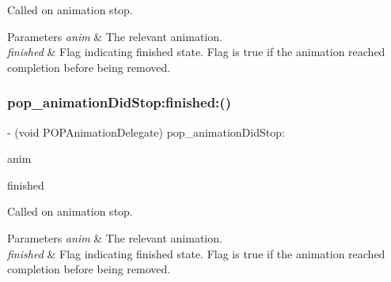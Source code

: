 Called on animation stop. 
\begin{DoxyParams}{Parameters}
{\em anim} & The relevant animation. \\
\hline
{\em finished} & Flag indicating finished state. Flag is true if the animation reached completion before being removed. \\
\hline
\end{DoxyParams}
\mbox{\label{protocol_p_o_p_animation_delegate_01-p_a5c84da0fa9e5baf068c950be6a494c07}} 
\subsubsection{\texorpdfstring{pop\+\_\+animation\+Did\+Stop\+:finished\+:()}{pop\_animationDidStop:finished:()}\hspace{0.1cm}{\footnotesize\ttfamily [2/3]}}
{\footnotesize\ttfamily -\/ (void P\+O\+P\+Animation\+Delegate) pop\+\_\+animation\+Did\+Stop\+: \begin{DoxyParamCaption}\item[{(\mbox{\hyperlink{interface_p_o_p_animation}{P\+O\+P\+Animation}} $\ast$)}]{anim }\item[{finished:(B\+O\+OL)}]{finished }\end{DoxyParamCaption}\hspace{0.3cm}{\ttfamily [optional]}}

Called on animation stop. 
\begin{DoxyParams}{Parameters}
{\em anim} & The relevant animation. \\
\hline
{\em finished} & Flag indicating finished state. Flag is true if the animation reached completion before being removed. \\
\hline
\end{DoxyParams}
\mbox{\label{protocol_p_o_p_animation_delegate_01-p_a5c84da0fa9e5baf068c950be6a494c07}} 
